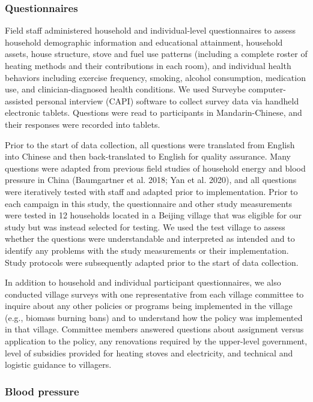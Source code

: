 \documentclass[
  letterpaper,
  DIV=11,
  numbers=noendperiod]{scrartcl}
\begin{document}
\hypertarget{questionnaires}{%
\subsubsection{Questionnaires}\label{questionnaires}}

Field staff administered household and individual-level questionnaires
to assess household demographic information and educational attainment,
household assets, house structure, stove and fuel use patterns
(including a complete roster of heating methods and their contributions
in each room), and individual health behaviors including exercise
frequency, smoking, alcohol consumption, medication use, and
clinician-diagnosed health conditions. We used Surveybe
computer-assisted personal interview (CAPI) software to collect survey
data via handheld electronic tablets. Questions were read to
participants in Mandarin-Chinese, and their responses were recorded into
tablets.

Prior to the start of data collection, all questions were translated
from English into Chinese and then back-translated to English for
quality assurance. Many questions were adapted from previous field
studies of household energy and blood pressure in China (Baumgartner et
al. 2018; Yan et al. 2020), and all questions were iteratively tested
with staff and adapted prior to implementation. Prior to each campaign
in this study, the questionnaire and other study measurements were
tested in 12 households located in a Beijing village that was eligible
for our study but was instead selected for testing. We used the test
village to assess whether the questions were understandable and
interpreted as intended and to identify any problems with the study
measurements or their implementation. Study protocols were subsequently
adapted prior to the start of data collection.

In addition to household and individual participant questionnaires, we
also conducted village surveys with one representative from each village
committee to inquire about any other policies or programs being
implemented in the village (e.g., biomass burning bans) and to
understand how the policy was implemented in that village. Committee
members answered questions about assignment versus application to the
policy, any renovations required by the upper-level government, level of
subsidies provided for heating stoves and electricity, and technical and
logistic guidance to villagers.

\hypertarget{blood-pressure}{%
\subsubsection{Blood pressure}\label{blood-pressure}}
\end{document}
